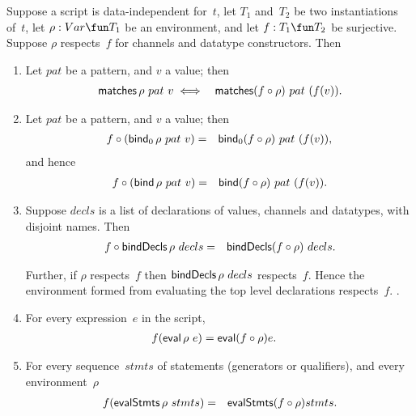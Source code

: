 \begin{prop}
\label{prop:expressions-1}
Suppose a script is data-independent for~$t$, let $T_1$ and~$T_2$ be two
instantiations of~$t$, let $\rho: Var \fun T_1$ be an environment, and let $f
: T_1 \fun T_2$ be surjective.  Suppose $\rho$ respects~$f$ for channels and
datatype constructors.  Then
\begin{enumerate}
\item\label{item:matches} Let $pat$ be a pattern, and $v$ a value; then
\begin{eqnarray*}
  \mathop{\sf matches} \rho~ pat~v & \iff & \mathop{\sf matches} (f\circ\rho) ~ pat~(f(v)).
\end{eqnarray*}

\item\label{item:bind}
Let $pat$ be a pattern, and $v$ a value; then
\begin{eqnarray*}
f \circ (\mathop{\sf bind}\nolimits_0 \rho~pat~v) &  = & \mathop{\sf bind}\nolimits_0 (f\circ\rho)~pat~(f(v)),
\end{eqnarray*}
and hence
\begin{eqnarray*}
f \circ (\mathop{\sf bind}\nolimits \rho~pat~v) & = & \mathop{\sf bind}\nolimits (f\circ\rho)~pat~(f(v)).
\end{eqnarray*}

\item\label{item:bindDecls} Suppose $decls$ is a list of declarations of
  values, channels and datatypes, with disjoint names.  Then
  \begin{eqnarray*}
  f \circ \mathop{\sf bindDecls} \rho~decls & = & \mathop{\sf bindDecls} (f \circ \rho)~decls.
  \end{eqnarray*}


Further, if $\rho$ respects~$f$ then $\mathop{\sf bindDecls} \rho~decls$ respects~$f$.
Hence the environment formed from evaluating the top level
declarations respects~$f$. \framebox{***}.

%





\item For every expression~$e$ in the script,
\begin{eqnarray*}
f(\mathop{\sf eval} \rho ~ e) & = \mathop{\sf eval} (f \circ \rho) e .
\end{eqnarray*}

\item\label{item:evalStmts}
For every sequence~$stmts$ of statements (generators or qualifiers), and every
environment~$\rho$\,  
\begin{eqnarray*}
f (\mathop{\sf evalStmts} \rho ~ stmts) & = & \mathop{\sf evalStmts} (f\circ\rho)stmts.
\end{eqnarray*}

\end{enumerate}
\end{prop}

